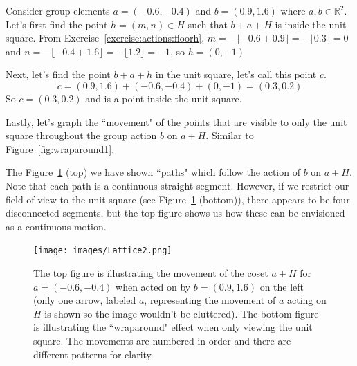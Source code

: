 \begin{example}\label{example:actions:IntLat2} Consider group elements $a=(-0.6,-0.4)$ and $b=(0.9,1.6)$ where $a,b \in \mathbb{R}^2$.
Let's first find the point $h=(m,n) \in H$ such that $b+a+H$ is inside the unit square. From Exercise~\ref{exercise:actions:floorh}, $m=-\lfloor -0.6+0.9 \rfloor=-\lfloor 0.3 \rfloor=0$ and $n=-\lfloor -0.4+1.6 \rfloor=-\lfloor 1.2 \rfloor=-1$, so $h=(0,-1)$

Next, let's find the point $b+a+h$ in the unit square, let's call this point $c$. $$c=(0.9,1.6)+(-0.6,-0.4)+(0,-1)=(0.3,0.2)$$ So $c=(0.3,0.2)$ and is a point inside the unit square.

Lastly, let's graph the ``movement" of the points that are visible to only the unit square throughout the group action $b$ on $a+H$. Similar to Figure~\ref{fig:wraparound1}.

The Figure~\ref{fig:Lattice2} (top) we have shown ``paths" which follow the action of $b$ on $a+H$. Note that each path is a continuous straight segment. However, if we restrict our field of view to the unit square (see Figure~\ref{fig:Lattice2} (bottom)), there appears to be four disconnected segments, but the top figure shows us how these can be envisioned as a continuous motion.

\begin{figure}[htpb]
\begin{center}
\texttt{[image: images/Lattice2.png]}
\caption{The top figure is illustrating the movement of the coset $a+H$ for $a=(-0.6,-0.4)$ when acted on by $b=(0.9,1.6)$ on the left (only one arrow, labeled $a$, representing the movement of $a$ acting on $H$ is shown so the image wouldn't be cluttered). The bottom figure is illustrating the ``wraparound" effect when only viewing the unit square. The movements are numbered in order and there are different patterns for clarity.}
\label{fig:Lattice2}
\end{center}
\end{figure}

\end{example}

